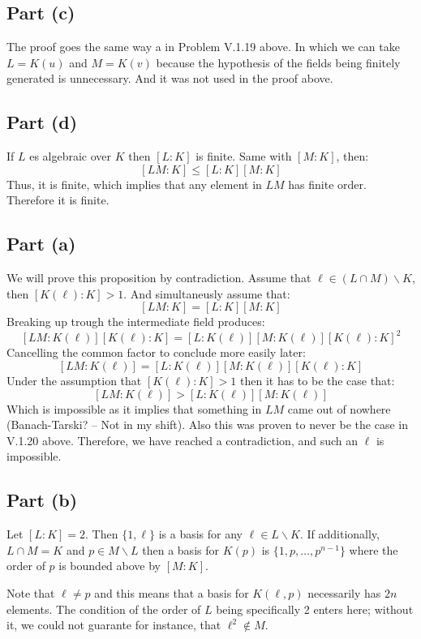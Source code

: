 \subsection*{Part (c)}
The proof goes the same way a in Problem V.1.19 above.
In which we can take $L=K(u)$ and $M=K(v)$ because the hypothesis of the fields being finitely generated is unnecessary.
And it was not used in the proof above.

\subsection*{Part (d)}
If $L$ es algebraic over $K$ then $[L:K]$ is finite. 
Same with $[M:K]$, then:
$$[LM:K]\leq [L:K][M:K]$$
Thus, it is finite, which implies that any element in $LM$ has finite order.
Therefore it is finite.

\subsection*{Part (a)}
We will prove this proposition by contradiction. Assume that $\ell \in (L\cap M)\backslash K$, then $[K(\ell):K]>1$. And simultaneusly assume that:
$$[LM:K] = [L:K][M:K]$$
Breaking up trough the intermediate field produces:
$$[LM:K(\ell)][K(\ell):K] = [L:K(\ell)][M:K(\ell)][K(\ell):K]^2$$
Cancelling the common factor to conclude more easily later:
$$[LM:K(\ell)] = [L:K(\ell)][M:K(\ell)][K(\ell):K]$$
Under the assumption that $[K(\ell):K]>1$ then it has to be the case that:
$$[LM:K(\ell)] > [L:K(\ell)][M:K(\ell)]$$
Which is impossible as it implies that something in $LM$ came out of nowhere (Banach-Tarski? -- Not in my shift). Also this was proven to never be the case in V.1.20 above. Therefore, we have reached a contradiction, and such an $\ell$ is impossible.

\subsection*{Part (b)}
Let $[L:K]=2$. Then $\{1,\ell\}$ is a basis for any $\ell\in L\backslash K$.
If additionally, $L\cap M = K$ and $p \in M\backslash L$ then a basis for $K(p)$ is $\{1,p,\ldots,p^{n-1}\}$ where the order of $p$ is bounded above by $[M:K]$. 

Note that $\ell\neq p$ and this means that a basis for $K(\ell,p)$ necessarily has $2n$ elements. The condition of the order of $L$ being specifically 2 enters here; without it, we could not guarante for instance, that $\ell^2\notin M$. 

